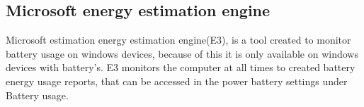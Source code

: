 \subsection*{Microsoft energy estimation engine}
Microsoft estimation energy estimation engine(E3), is a tool created to monitor battery usage on windows devices, because of this it is only available on windows devices with battery's. E3 monitors the computer at all times to created battery energy usage reports, that can be accessed in the power  battery settings under Battery usage. 